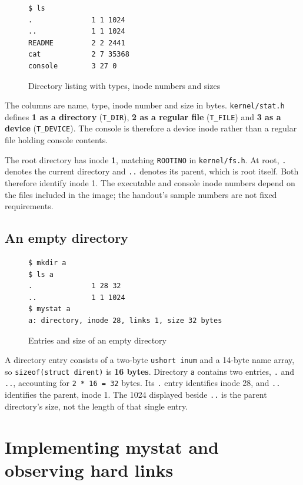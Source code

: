 \documentclass{../latex/utmreport}
\begin{document}
\begin{figure}[H]
\begin{lstlisting}
$ ls
.              1 1 1024
..             1 1 1024
README         2 2 2441
cat            2 7 35368
console        3 27 0
\end{lstlisting}
\caption{Directory listing with types, inode numbers and sizes}
\end{figure}

The columns are name, type, inode number and size in bytes.
\texttt{kernel/stat.h} defines \textbf{1 as a directory}
(\texttt{T\_DIR}), \textbf{2 as a regular file} (\texttt{T\_FILE}) and
\textbf{3 as a device} (\texttt{T\_DEVICE}). The console is therefore a
device inode rather than a regular file holding console contents.

The root directory has inode \textbf{1}, matching \texttt{ROOTINO} in
\texttt{kernel/fs.h}. At root, \texttt{.} denotes the current directory
and \texttt{..} denotes its parent, which is root itself. Both therefore
identify inode 1. The executable and console inode numbers depend on the
files included in the image; the handout's sample numbers are not fixed
requirements.

\section{An empty directory}\label{an-empty-directory}

\begin{figure}[H]
\begin{lstlisting}
$ mkdir a
$ ls a
.              1 28 32
..             1 1 1024
$ mystat a
a: directory, inode 28, links 1, size 32 bytes
\end{lstlisting}
\caption{Entries and size of an empty directory}
\end{figure}

A directory entry consists of a two-byte \texttt{ushort\ inum} and a
14-byte name array, so \texttt{sizeof(struct\ dirent)} is \textbf{16
bytes}. Directory \texttt{a} contains two entries, \texttt{.} and
\texttt{..}, accounting for \texttt{2\ *\ 16\ =\ 32} bytes. Its
\texttt{.} entry identifies inode 28, and \texttt{..} identifies the
parent, inode 1. The 1024 displayed beside \texttt{..} is the parent
directory's size, not the length of that single entry.

\chapter{Implementing mystat and observing hard
links}\label{implementing-mystat-and-observing-hard-links}
\end{document}
